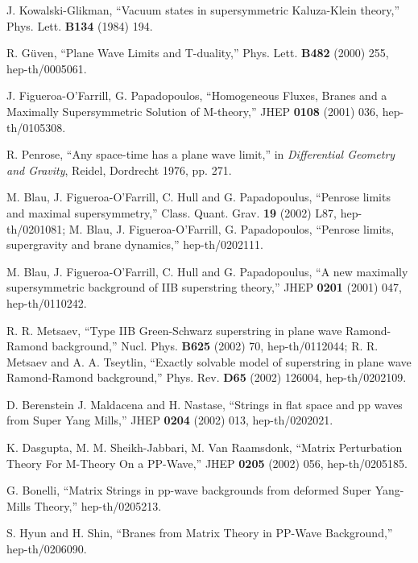 \documentclass[a4paper,12pt]{article}
\begin{document}
\newpage
\begin{thebibliography}{99}
  
 J. Kowalski-Glikman, ``Vacuum states in
  supersymmetric Kaluza-Klein theory,'' Phys. Lett. {\bf B134} (1984)
  194.

 R. G\"{u}ven, ``Plane Wave Limits and T-duality,''
  Phys. Lett. {\bf B482} (2000) 255, hep-th/0005061.

 J. Figueroa-O'Farrill, G. Papadopoulos, ``Homogeneous
  Fluxes, Branes and a Maximally Supersymmetric Solution of
  M-theory,'' JHEP {\bf 0108} (2001) 036, hep-th/0105308.

 R. Penrose, ``Any space-time has a plane wave
  limit,'' in {\it Differential Geometry and Gravity}, Reidel,
  Dordrecht 1976, pp. 271.
  
 M. Blau, J. Figueroa-O'Farrill, C. Hull and G.
  Papadopoulus, ``Penrose limits and maximal supersymmetry,'' Class.
  Quant. Grav. {\bf 19} (2002) L87, hep-th/0201081; M. Blau, J.
  Figueroa-O'Farrill, G. Papadopoulos, ``Penrose limits, supergravity
  and brane dynamics,'' hep-th/0202111.

 M. Blau, J. Figueroa-O'Farrill, C. Hull and G.
  Papadopoulus, ``A new maximally supersymmetric background of IIB
  superstring theory,'' JHEP {\bf 0201} (2001) 047, hep-th/0110242.

 R. R. Metsaev, ``Type IIB Green-Schwarz superstring
in plane wave Ramond-Ramond background,'' Nucl. Phys.  {\bf B625}
(2002) 70, hep-th/0112044; R. R. Metsaev and A. A. Tseytlin, ``Exactly
solvable model of superstring in plane wave Ramond-Ramond
background,'' Phys.  Rev. {\bf D65} (2002) 126004, hep-th/0202109.

 D. Berenstein J. Maldacena and H. Nastase, ``Strings
  in flat space and pp waves from \coordHE{} Super Yang Mills,''
  JHEP {\bf 0204} (2002) 013, hep-th/0202021.

 K. Dasgupta, M. M. Sheikh-Jabbari, M. Van Raamsdonk,
  ``Matrix Perturbation Theory For M-Theory On a PP-Wave,'' JHEP {\bf
    0205} (2002) 056, hep-th/0205185.

 G. Bonelli, ``Matrix Strings in pp-wave backgrounds
from deformed Super Yang-Mills Theory,'' hep-th/0205213.

 S. Hyun and H. Shin, ``Branes from Matrix Theory in
  PP-Wave Background,'' hep-th/0206090.
  

\end{thebibliography}
\end{document}
